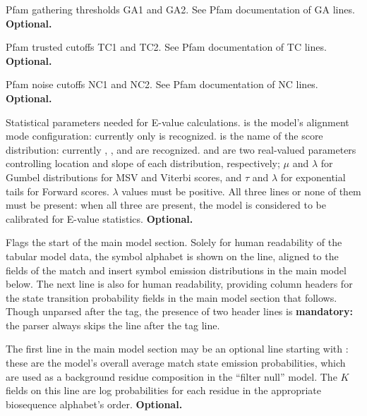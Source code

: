 \begin{sreitems}{}
\item [\monob{GA    <f> <f>}] Pfam gathering thresholds GA1 and GA2.
See Pfam documentation of GA lines. \textbf{Optional.}

\item [\monob{TC <f> <f>}] Pfam trusted cutoffs TC1 and TC2.  See
Pfam documentation of TC lines. \textbf{Optional.}

\item [\monob{NC <f> <f>}] Pfam noise cutoffs NC1 and NC2.  See Pfam
documentation of NC lines. \textbf{Optional.}

\item [\monob{STATS <s1> <s2> <f1> <f2>}] Statistical parameters
  needed for E-value calculations.  is the model's
  alignment mode configuration: currently only  is
  recognized.  is the name of the score distribution:
  currently , , and  are
  recognized.   and  are two real-valued
  parameters controlling location and slope of each distribution,
  respectively; $\mu$ and $\lambda$ for Gumbel distributions for MSV
  and Viterbi scores, and $\tau$ and $\lambda$ for exponential tails
  for Forward scores.  $\lambda$ values must be positive.  All three
  lines or none of them must be present: when all three are present,
  the model is considered to be calibrated for E-value
  statistics. \textbf{Optional.}

\item [\monob{HMM }] Flags the start of the main model
section. Solely for human readability of the tabular model data, the
symbol alphabet is shown on the  line, aligned to the fields
of the match and insert symbol emission distributions in the main
model below. The next line is also for human readability, providing
column headers for the state transition probability fields in the main
model section that follows. Though unparsed after the  tag,
the presence of two header lines is \textbf{mandatory:} the parser
always skips the line after the  tag line.

\item [\monob{COMPO <f>*K}] The first line in the main model section
may be an optional line starting with : these are the
model's overall average match state emission probabilities, which are
used as a background residue composition in the ``filter null''
model. The $K$ fields on this line are log probabilities for each
residue in the appropriate biosequence alphabet's
order. \textbf{Optional.}

\end{sreitems}

